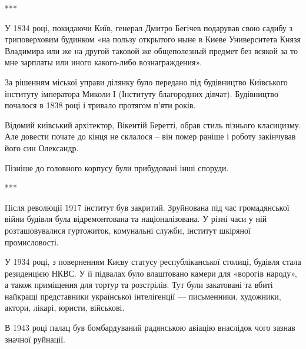 ***

У 1834 році, покидаючи Київ, генерал Дмитро Бегічев подарував свою садибу з
триповерховим будинком «на пользу открытого ныне в Киеве Университета Князя
Владимира или же на другой таковой же общеполезный предмет без всякой за то мне
зарплаты или иного какого-либо вознаграждения». 

За рішенням міської управи ділянку було передано під будівництво Київського
інституту імператора Миколи I (Інституту благородних дівчат). Будівництво
почалося в 1838 році і тривало протягом п'яти років.


Відомий київський архітектор, Вікентій Беретті, обрав стиль пізнього
класицизму. Але довести почате до кінця не склалося – він помер раніше і роботу
закінчував його син Олександр. 


Пізніше до головного корпусу були прибудовані інші споруди.

***

Після революції 1917 інститут був закритий. Зруйнована під час громадянської
війни будівля була відремонтована та націоналізована. У різні часи у ній
розташовувалися гуртожиток, комунальні служби, інститут шкіряної промисловості. 

У 1934 році, з поверненням Києву статусу республіканської столиці, будівля
стала резиденцією НКВС. У її підвалах було влаштовано камери для «ворогів
народу», а також приміщення для тортур та розстрілів. Тут були закатовані та
вбиті найкращі представники української інтелігенції — письменники, художники,
актори, лікарі, юристи, військові. 

\begin{multicols}{3} %
\setlength{\parindent}{0pt}


\end{multicols} %

В 1943 році палац був бомбардуваний радянською авіацію внаслідок чого зазнав
значної руйнації.


